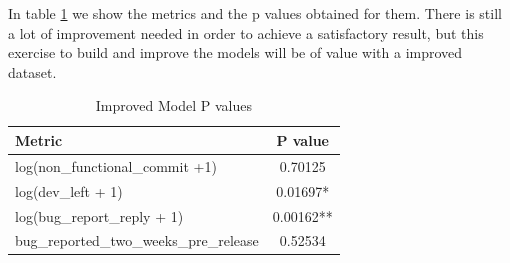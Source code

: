 In table \ref{tab:improved_model_p_values} we show the metrics and the p values obtained for them. There is still a lot of improvement needed in order to achieve a satisfactory result, but this exercise to build and improve the models will be of value with a improved dataset.

\begin{table}[!hbt]
      \begin{center}
            \caption{Improved Model P values}
            \label{tab:improved_model_p_values}
            \begin{tabular}{l| c}
            \toprule
            \textbf{Metric}  & \textbf{P value} \\ \midrule                                         
            log(non\_functional\_commit +1)                  &            0.70125 \\ 
            log(dev\_left + 1)                               &            0.01697* \\ 
            log(bug\_report\_reply + 1)                      &           0.00162** \\ 
            bug\_reported\_two\_weeks\_pre\_release          &                 0.52534 \\ \bottomrule
            \end{tabular}
      \end{center}
\end{table}

\vspace{1mm}
\vspace{1mm}
